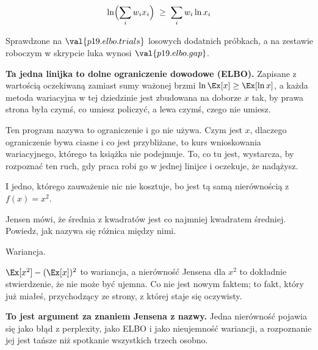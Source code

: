 \begin{fr}
\begin{ansblock}
\[ \ln\Bigl(\sum_i w_i x_i\Bigr) \;\ge\; \sum_i w_i \ln x_i \]
\end{ansblock}

Sprawdzone na $\val{p19.elbo.trials}$ losowych dodatnich próbkach, a na
zestawie roboczym w skrypcie luka wynosi $\val{p19.elbo.gap}$.

\textbf{Ta jedna linijka to dolne ograniczenie dowodowe
(ELBO).} Zapisane z
wartością oczekiwaną zamiast sumy ważonej brzmi
$\ln \Ex[x] \ge \Ex[\ln x]$, a każda metoda wariacyjna w tej dziedzinie jest
zbudowana na doborze $x$ tak, by prawa strona była czymś, co umiesz policzyć,
a lewa czymś, czego nie umiesz.

\begin{rigourbox}
Ten program nazywa to ograniczenie i go nie używa. Czym jest $x$, dlaczego
ograniczenie bywa ciasne i co jest przybliżane, to kurs wnioskowania
wariacyjnego, którego ta książka nie podejmuje. To, co tu jest, wystarcza, by
rozpoznać ten ruch, gdy praca robi go w jednej linijce i oczekuje, że
nadążysz.
\end{rigourbox}
\end{fr}

\begin{fr}
I jedno, którego zauważenie nic nie kosztuje, bo jest tą samą nierównością z
$f(x) = x^{2}$.

Jensen mówi, że średnia z kwadratów jest co najmniej kwadratem średniej.
Powiedz, jak nazywa się różnica między nimi.
\dotline
\nextframe
\end{fr}

\begin{fr}
\begin{ansblock}
Wariancja.
\end{ansblock}

$\Ex[x^{2}] - (\Ex[x])^{2}$ to wariancja, a nierówność Jensena dla $x^{2}$ to
dokładnie stwierdzenie, że nie może być ujemna. Co nie jest nowym faktem; to
fakt, który już miałeś, przychodzący ze strony, z której staje się oczywisty.

\textbf{To jest argument za znaniem Jensena z nazwy.} Jedna nierówność
pojawia się jako błąd z perplexity, jako ELBO i jako nieujemność wariancji, a
rozpoznanie jej jest tańsze niż spotkanie wszystkich trzech osobno.
\end{fr}

